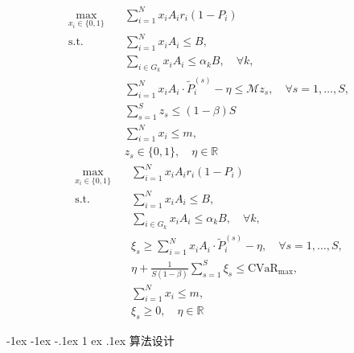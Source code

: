 \documentclass[12pt,nonblindrev]{write_paper}
\makeatletter
\renewcommand\section{\@startsection {section}{1}{\z@}%
                                   {-1ex \@plus -1ex \@minus -.1ex}%
                                   {1 ex \@plus.1ex}%
                                   {\normalfont\large\bfseries}}
\makeatother
\begin{document}
\begin{equation}
\begin{aligned}
\max_{x_i \in \{0,1\}} \quad & \sum_{i=1}^N x_i A_i  r_i(1 - P_i)  \\
\text{s.t.} \quad
& \sum_{i=1}^N x_i A_i \le B , \\
& \sum_{i \in G_k} x_i A_i \le \alpha_k B, \quad \forall k , \\
& \sum_{i=1}^N x_i A_i \cdot \tilde{P}_i^{(s)} - \eta \le \mathcal{M} z_s, \quad \forall s=1,\dots,S ,\\
& \sum_{s=1}^S z_s \le (1 - \beta) S \\
& \sum_{i=1}^N x_i \le m , \\
& z_s \in \{0,1\}, \quad \eta \in \mathbb{R}
\end{aligned}
\label{eq:var_model}
\tag{P2P-VaR}
\end{equation}
\begin{equation}
\begin{aligned}
\max_{x_i \in \{0,1\}} \quad & \sum_{i=1}^N x_i A_i r_i(1 - P_i)  \\
\text{s.t.} \quad
& \sum_{i=1}^N x_i A_i \le B , \\
& \sum_{i \in G_k} x_i A_i \le \alpha_k B, \quad \forall k , \\
& \xi_s \ge \sum_{i=1}^N x_i A_i \cdot \tilde{P}_i^{(s)} - \eta, \quad \forall s = 1,\dots,S , \\
& \eta + \frac{1}{S(1 - \beta)} \sum_{s=1}^S \xi_s \le \text{CVaR}_{\max}, \\
& \sum_{i=1}^N x_i \le m , \\
& \xi_s \ge 0, \quad \eta \in \mathbb{R}
\end{aligned}
\label{eq:cvar_model}
\tag{P2P-CVaR}
\end{equation}

\section{算法设计}
\end{document}

